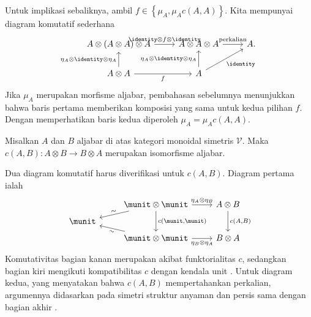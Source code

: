 \begin{bukti}
	Untuk implikasi sebaliknya, ambil
	$f\in\left\{\mu_A,\mu_Ac(A,A)\right\}$. Kita mempunyai diagram komutatif
	sederhana
	\[\begin{tikzcd}
		A \otimes (A \otimes A) \otimes A \arrow[r, "{\identity \otimes f \otimes \identity}"] & A \otimes A \otimes A \arrow[r, "{\text{perkalian}}"] & A . \\
		A \otimes A \arrow[u, "{\eta_A \otimes \identity \otimes \eta_A}"] \arrow[r, "f"'] & A \arrow[ru, "\identity"'] \arrow[u, "{\eta_A \otimes \identity \otimes \eta_A}"] &
	\end{tikzcd}\]
	Jika $\mu_A$ merupakan morfisme aljabar, pembahasan sebelumnya menunjukkan
	bahwa baris pertama memberikan komposisi yang sama untuk kedua pilihan $f$.
	Dengan memperhatikan baris kedua diperoleh
	$\mu_A=\mu_Ac(A,A)$.
\end{bukti}

\begin{lema}\label{prop:c-as-isom-alg}
	Misalkan $A$ dan $B$ aljabar di atas kategori monoidal simetris
	$\mathcal{V}$. Maka $c(A,B):A\otimes B\to B\otimes A$ merupakan isomorfisme
	aljabar.
\end{lema}
\begin{bukti}
	Dua diagram komutatif harus diverifikasi untuk $c(A,B)$. Diagram pertama
	ialah
	\[\begin{tikzcd}[row sep=tiny]
		& \munit \otimes \munit \arrow[ld, "\sim" sloped] \arrow[dd, "{c(\munit, \munit)}"] \arrow[r, "{\eta_A \otimes \eta_B}"] & A \otimes B \arrow[dd, "{c(A, B)}"] \\
		\munit & & \\
		& \munit \otimes \munit \arrow[lu, "\sim"' sloped] \arrow[r, "{\eta_B \otimes \eta_A}"'] & B \otimes A
	\end{tikzcd}\]
	Komutativitas bagian kanan merupakan akibat funktorialitas $c$, sedangkan
	bagian kiri mengikuti kompatibilitas $c$ dengan kendala unit
	\cite[(3.12)]{Li1}. Untuk diagram kedua, yang menyatakan bahwa $c(A,B)$
	mempertahankan perkalian, argumennya didasarkan pada simetri struktur anyaman
	dan persis sama dengan bagian akhir \cite[\S 7.4]{Li1}.
\end{bukti}

